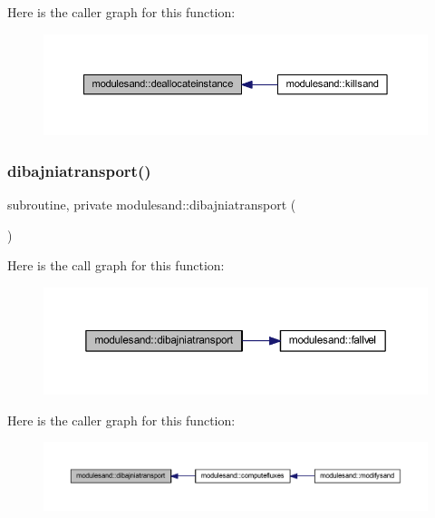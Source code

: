 Here is the caller graph for this function\+:\nopagebreak
\begin{figure}[H]
\begin{center}
\leavevmode
\includegraphics[width=350pt]{namespacemodulesand_afe6b0604957817eebf137ff6997e6351_icgraph}
\end{center}
\end{figure}
\mbox{\label{namespacemodulesand_a2daf31a4265bfcae491e0968f275ec7a}} 
\subsubsection{\texorpdfstring{dibajniatransport()}{dibajniatransport()}}
{\footnotesize\ttfamily subroutine, private modulesand\+::dibajniatransport (\begin{DoxyParamCaption}{ }\end{DoxyParamCaption})\hspace{0.3cm}{\ttfamily [private]}}

Here is the call graph for this function\+:\nopagebreak
\begin{figure}[H]
\begin{center}
\leavevmode
\includegraphics[width=350pt]{namespacemodulesand_a2daf31a4265bfcae491e0968f275ec7a_cgraph}
\end{center}
\end{figure}
Here is the caller graph for this function\+:\nopagebreak
\begin{figure}[H]
\begin{center}
\leavevmode
\includegraphics[width=350pt]{namespacemodulesand_a2daf31a4265bfcae491e0968f275ec7a_icgraph}
\end{center}
\end{figure}
\mbox{\label{namespacemodulesand_a81b51403d378065ebb345027ab24a5af}} 
